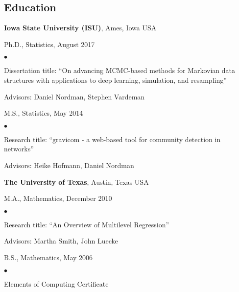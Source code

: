 \documentclass[margin,line]{res}
\newenvironment{list1}{
  \begin{list}{\ding{113}}{%
      \setlength{\itemsep}{0in}
      \setlength{\parsep}{0in} \setlength{\parskip}{0in}
      \setlength{\topsep}{0in} \setlength{\partopsep}{0in}
      \setlength{\leftmargin}{0.17in}}}{\end{list}}
\newenvironment{list2}{
  \begin{list}{$\bullet$}{%
      \setlength{\itemsep}{0in}
      \setlength{\parsep}{0in} \setlength{\parskip}{0in}
      \setlength{\topsep}{0in} \setlength{\partopsep}{0in}
      \setlength{\leftmargin}{0.2in}}}{\end{list}}
\begin{document}
\begin{resume}
\section{\sc Education}
{\bf Iowa State University (ISU)}, Ames, Iowa USA\\
\vspace*{-.1in}
\begin{list1}
\item[]Ph.D., Statistics, August 2017 
\begin{list2}
\vspace*{.05in}
\item[] Dissertation title:  ``On advancing MCMC-based methods for Markovian data structures with applications to deep learning, simulation, and resampling''
\item[] Advisors: Daniel Nordman, Stephen Vardeman
\end{list2}
\vspace*{.05in}
\item[]M.S., Statistics, May 2014
\begin{list2}
\vspace*{.05in}
\item[] Research title:  ``gravicom - a web-based tool for community detection in networks''
\item[] Advisors: Heike Hofmann, Daniel Nordman
\end{list2}
\end{list1}
{\bf The University of Texas}, Austin, Texas USA\\
\vspace*{-.1in}
\begin{list1}
\item[]M.A., Mathematics, December 2010
\begin{list2}
\vspace*{.05in}
\item[] Research title:  ``An Overview of Multilevel Regression''
\item[] Advisors: Martha Smith, John Luecke
\end{list2}
\vspace*{.05in}
\item[] B.S., Mathematics, May 2006
\begin{list2}
\vspace*{.05in}
\item[] Elements of Computing Certificate
\end{list2}
\end{list1}


\end{resume}
\end{document}
